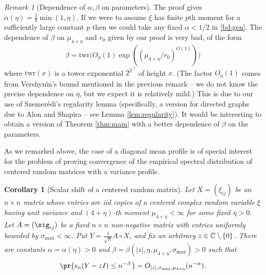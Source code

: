 \documentclass[aop,preprint]{imsart}
\theoremstyle{plain}
\newtheorem{corollary}[theorem]{Corollary}
\theoremstyle{definition}
\theoremstyle{remark}
\newtheorem{remark}[theorem]{Remark}
\numberwithin{equation}{section}
\numberwithin{theorem}{section}
\begin{document}
\begin{remark}[Dependence of $\alpha,\beta$ on parameters]	\label{rmk:rdep}
The proof gives $\alpha(\eta)=\frac19\min(1,\eta)$. If we were to assume $\xi$ has finite $p$th moment for a sufficiently large constant $p$ then we could take any fixed $\alpha<1/2$ in \eqref{bd:gen}.
The dependence of $\beta$ on 
$\mu_{4+\eta}$
%
and $r_0$ given by our proof is very bad, of the form
\begin{equation}
\beta = \text{twr}\big(O_\eta(1)\exp((\mu_{4+\eta}/r_0)^{O(1)})\big)
\end{equation}
where $\text{twr}(x)$ is a tower exponential $2^{2^{\iddots^2}}$ of height $x$.
(The factor $O_\eta(1)$ comes from Vershynin's bound mentioned in the previous remark -- we do not know the precise dependence on $\eta$, but we expect it is relatively mild.)
This is due to our use of Szemer\'edi's regularity lemma (specifically, a version for directed graphs due to Alon and Shapira -- see Lemma \ref{lem:regularity}). 
It would be interesting to obtain a version of Theorem \ref{thm:main} with a better dependence of $\beta$ on the parameters. 
\end{remark}

As we remarked above, the case of a diagonal mean profile is of special interest for the problem of proving convergence of the empirical spectral distribution of centered random matrices with a variance profile.

\begin{corollary}[Scalar shift of a centered random matrix]	\label{cor:scalarshift}
Let $X=(\xi_{ij})$ be an $n\times n$ matrix whose entries are iid copies of a centered complex random variable $\xi$ having unit variance and $(4+\eta)$-th moment $\mu_{4+\eta}<\infty$ for some fixed $\eta>0$.
Let $A=(\sig_{ij})$ be a fixed $n\times n$ non-negative matrix with entries uniformly bounded by $\sigma_{\max}<\infty$.
Put $Y= \frac1{\sqrt{n}}A\circ X$, and fix an arbitrary $z\in {\mathbb C}\setminus\{0\}$.
There are constants $\alpha=\alpha(\eta)>0$ and $\beta=\beta(|z|,\eta,\mu_{4+\eta},\sigma_{\max})>0$ such that
\begin{equation}	\label{bd:scalarshift}
\pr\big( s_n(Y-zI)\le n^{-\beta} \, \big) =O_{|z|,\sigma_{\max},\mu_{4+\eta}}(n^{-\alpha}).
\end{equation}
\end{corollary}
\end{document}
